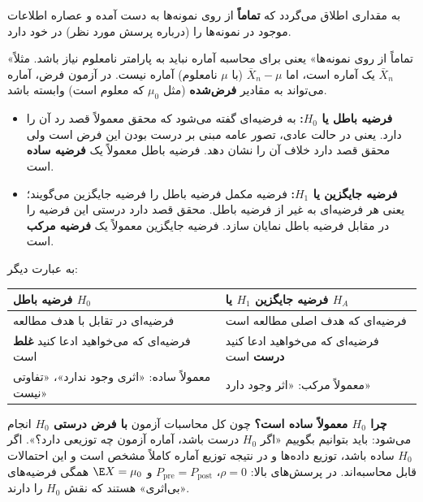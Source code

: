 \begin{definition}
به مقداری اطلاق می‌گردد که \textbf{تماماً} از روی نمونه‌ها به دست آمده و عصاره اطلاعات موجود در نمونه‌ها را (درباره پرسش مورد نظر) در خود دارد.
\end{definition}
«تماماً از روی نمونه‌ها» یعنی برای محاسبه آماره نباید به پارامتر نامعلوم نیاز باشد. مثلاً $\bar X_n$ یک آماره است، اما $\bar X_n-\mu$ (با $\mu$ نامعلوم) آماره نیست. در آزمون فرض، آماره می‌تواند به مقادیر \textbf{فرض‌شده} (مثل $\mu_0$ که معلوم است) وابسته باشد.

\begin{definition}
\begin{itemize}
\item \textbf{فرضیه باطل  یا $H_0$:} به فرضیه‌ای گفته می‌شود که محقق  معمولاً قصد رد آن را دارد. یعنی در حالت عادی، تصور عامه مبنی بر درست بودن این فرض است ولی محقق قصد دارد خلاف آن را نشان دهد. فرضیه باطل معمولاً یک \textbf{فرضیه ساده} است.
\item \textbf{فرضیه جایگزین  یا $H_1$:} فرضیه مکمل فرضیه باطل را فرضیه جایگزین می‌گویند؛ یعنی هر فرضیه‌ای به غیر از فرضیه باطل. محقق قصد دارد درستی این فرضیه را در مقابل فرضیه باطل نمایان سازد. فرضیه جایگزین معمولاً یک \textbf{فرضیه مرکب} است.
\end{itemize}
\end{definition}

به عبارت دیگر:
\begin{center}
\renewcommand{\arraystretch}{1.45}
\begin{tabular}{>{\raggedright\arraybackslash}p{5.6cm}|>{\raggedright\arraybackslash}p{5.6cm}}
فرضیه باطل $H_0$ & فرضیه جایگزین $H_1$ یا $H_A$\\\hline
فرضیه‌ای در تقابل با هدف مطالعه & فرضیه‌ای که هدف اصلی مطالعه است\\
فرضیه‌ای که می‌خواهید ادعا کنید \textbf{غلط} است & فرضیه‌ای که می‌خواهید ادعا کنید \textbf{درست} است\\
معمولاً ساده: «اثری وجود ندارد»، «تفاوتی نیست» & معمولاً مرکب: «اثر وجود دارد»
\end{tabular}
\end{center}

\textbf{چرا $H_0$ معمولاً ساده است؟} چون کل محاسبات آزمون \textbf{با فرض درستی $H_0$} انجام می‌شود: باید بتوانیم بگوییم «اگر $H_0$ درست باشد، آماره آزمون چه توزیعی دارد؟». اگر $H_0$ ساده باشد، توزیع داده‌ها و در نتیجه توزیع آماره کاملاً مشخص است و این احتمالات قابل محاسبه‌اند. در پرسش‌های بالا: $\rho=0$، $P_{\text{pre}}=P_{\text{post}}$ و $\E X=\mu_0$ همگی فرضیه‌های «بی‌اثری» هستند که نقش $H_0$ را دارند.

